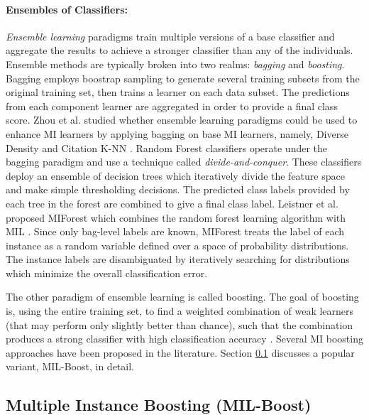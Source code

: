\paragraph{Ensembles of Classifiers:}
\textit{Ensemble learning} paradigms train multiple versions of a base classifier and aggregate the results to achieve a stronger classifier than any of the individuals.  Ensemble methods are typically broken into two realms: \textit{bagging} and \textit{boosting}.  Bagging employs boostrap sampling to generate several training subsets from the original training set, then trains a learner on each data subset.  The predictions from each component learner are aggregated in order to provide a final class score.   Zhou et al. studied whether ensemble learning paradigms could be used to enhance MI learners by applying bagging on base MI learners, namely, Diverse Density and Citation K-NN \citep{Zhou2003MIEnsemble}.  Random Forest classifiers operate under the bagging paradigm and use a technique called \textit{divide-and-conquer}.  These classifiers deploy an ensemble of decision trees which iteratively divide the feature space and make simple thresholding decisions.  The predicted class labels provided by each tree in the forest are combined to give a final class label.  Leistner et al. proposed MIForest which combines the random forest learning algorithm with MIL \citep{Leistner2010MIForests}.  Since only bag-level labels are known, MIForest treats the label of each instance as a random variable defined over a space of probability distributions.  The instance labels are disambiguated by iteratively searching for distributions which minimize the overall classification error.  

The other paradigm of ensemble learning is called boosting. The goal of boosting is, using the entire training set, to find a  weighted combination of weak learners (that may perform only slightly better than chance), such that the combination produces a strong classifier with high classification accuracy \citep{Zhang2006MIBoosting}. Several MI boosting approaches have been proposed in the literature.  Section \ref{sec:MILBoost} discusses a popular variant, MIL-Boost, in detail.


\subsection{Multiple Instance Boosting (MIL-Boost)} \label{sec:MILBoost}

